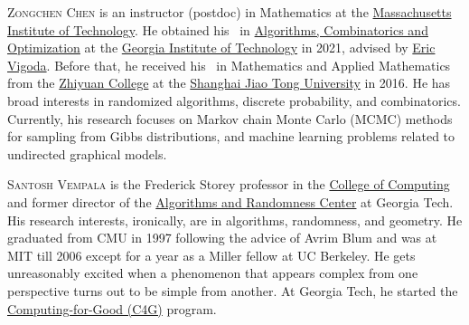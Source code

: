 \documentclass{toc}
\begin{document}
%
%
%
%
%
%
%
%
%
%
%
%
%
%
\begin{tocaboutauthors}
\begin{tocabout}[chen]  %
  \textsc{Zongchen Chen} is an instructor (postdoc) in Mathematics at the \href{https://www.mit.edu/}{Massachusetts Institute of Technology}.
  He obtained his \phd\ in \href{https://aco.gatech.edu/}{Algorithms, Combinatorics and Optimization} at
the  %
\href{https://www.gatech.edu/}{Georgia Institute of Technology} in 2021,
%
%
%
advised by \href{https://sites.cs.ucsb.edu/~vigoda/}{Eric Vigoda}. 
Before that, he received his \bsc\ in Mathematics and Applied Mathematics from the \href{https://en.zhiyuan.sjtu.edu.cn/}{Zhiyuan College} at the \href{https://en.sjtu.edu.cn/}{Shanghai Jiao Tong University} in 2016.
He has broad interests in randomized algorithms, discrete probability, and combinatorics. Currently, his research focuses on Markov chain Monte Carlo (MCMC) methods for sampling from Gibbs distributions, and machine learning problems related to undirected graphical models.
%
%
\end{tocabout}
\begin{tocabout}[vempala]
  \textsc{Santosh Vempala} is the Frederick Storey professor in the \href{https://www.cc.gatech.edu/}{College of Computing} and former director of the \href{http://www.arc.gatech.edu/}{Algorithms and Randomness Center} at Georgia Tech. His research interests, ironically, are in algorithms, randomness, and geometry. He graduated from CMU in 1997 following the advice of Avrim Blum and was at MIT till 2006 except for a year as a Miller fellow at UC Berkeley. He gets unreasonably excited when a phenomenon that appears complex from one perspective turns out to be simple from another. At Georgia Tech, he started the
\href{https://c4g.gatech.edu/}{Computing-for-Good (C4G)} program.
\end{tocabout}
\end{tocaboutauthors}
\end{document}
